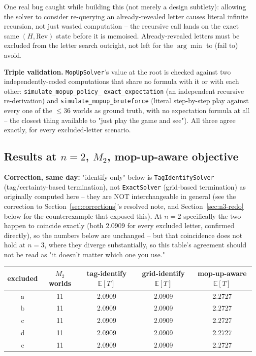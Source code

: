 \documentclass[11pt]{article}
\begin{document}
One real bug caught while building this (not merely a design subtlety):
allowing the solver to consider re-querying an already-revealed letter
causes literal infinite recursion, not just wasted computation -- the
recursive call lands on the exact same $(H,\mathrm{Rev})$ state before it
is memoised. Already-revealed letters must be excluded from the letter
search outright, not left for the $\arg\min$ to (fail to) avoid.

\textbf{Triple validation.} \texttt{MopUpSolver}'s value at the root is
checked against two independently-coded computations that share no
formula with it or with each other: \texttt{simulate\_mopup\_policy\_}
\texttt{exact\_expectation} (an independent recursive re-derivation) and
\texttt{simulate\_mopup\_bruteforce} (literal step-by-step play against
every one of the $\le$36 worlds as ground truth, with no expectation
formula at all -- the closest thing available to "just play the game and
see"). All three agree exactly, for every excluded-letter scenario.

\subsection{Results at $n=2$, $M_2$, mop-up-aware objective}

\textbf{Correction, same day:} "identify-only" below is
\texttt{TagIdentifySolver} (tag/certainty-based termination), not
\texttt{ExactSolver} (grid-based termination) as originally computed here
-- they are NOT interchangeable in general (see the correction to
Section~\ref{sec:corrections}'s resolved note, and
Section~\ref{sec:n3-redo} below for the counterexample that exposed this).
At $n=2$ specifically the two happen to coincide exactly (both 2.0909 for
every excluded letter, confirmed directly), so the numbers below are
unchanged -- but that coincidence does not hold at $n=3$, where they
diverge substantially, so this table's agreement should not be read as
"it doesn't matter which one you use."

\begin{center}
\begin{tabular}{ccccc}
\toprule
excluded & $M_2$ worlds & tag-identify $\mathbb{E}[T]$ & grid-identify $\mathbb{E}[T]$ & mop-up-aware $\mathbb{E}[T]$ \\
\midrule
a & 11 & 2.0909 & 2.0909 & 2.2727 \\
b & 11 & 2.0909 & 2.0909 & 2.2727 \\
c & 11 & 2.0909 & 2.0909 & 2.2727 \\
d & 11 & 2.0909 & 2.0909 & 2.2727 \\
e & 11 & 2.0909 & 2.0909 & 2.2727 \\
\bottomrule
\end{tabular}
\end{center}
\end{document}

